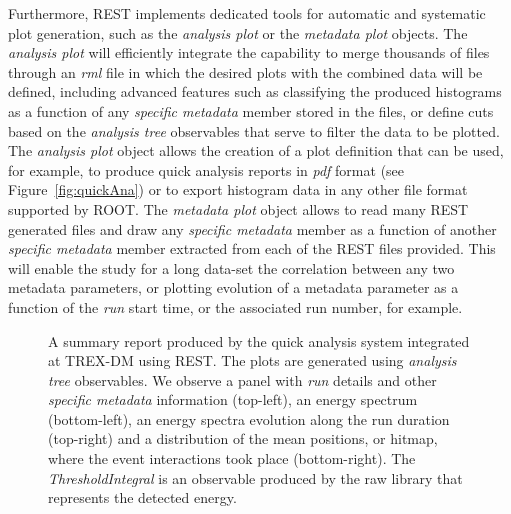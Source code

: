 Furthermore, REST implements dedicated tools for automatic and systematic plot generation, such as the \emph{analysis plot} or the \emph{metadata plot} objects. 
The \emph{analysis plot} will efficiently integrate the capability to merge thousands of files through an \emph{rml} file in which the desired plots with the combined data will be defined, including advanced features such as classifying the produced histograms as a function of any \emph{specific metadata} member stored in the files, or define cuts based on the \emph{analysis tree} observables that serve to filter the data to be plotted. The \emph{analysis plot} object allows the creation of a plot definition that can be used, for example, to produce quick analysis reports in \emph{pdf} format (see Figure~\ref{fig:quickAna}) or to export histogram data in any other file format supported by ROOT.
The \emph{metadata plot} object allows to read many REST generated files and draw any \emph{specific metadata} member as a function of another \emph{specific metadata} member extracted from each of the REST files provided. This will enable the study for a long data-set the correlation between any two metadata parameters, or plotting evolution of a metadata parameter as a function of the \emph{run} start time, or the associated run number, for example.

\begin{figure}[h]
  \centering
	\caption{A summary report produced by the quick analysis system integrated at TREX-DM using REST. The plots are generated using \emph{analysis tree} observables. We observe a panel with \emph{run} details and other \emph{specific metadata} information (top-left), an energy spectrum (bottom-left), an energy spectra evolution along the run duration (top-right) and a distribution of the mean positions, or hitmap, where the event interactions took place (bottom-right). The \emph{ThresholdIntegral} is an observable produced by the raw library that represents the detected energy.}
	\label{fig:executables}
\end{figure}

